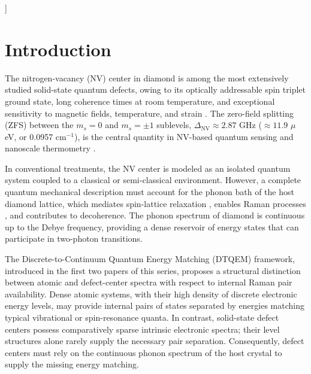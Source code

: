 \documentclass[11pt,a4paper]{article}
\begin{document}
\begin{@twocolumnfalse}
\begin{abstract}
These findings support the DTQEM screening hypothesis at the level of spectral structure: defect spectra are structurally incapable of supplying internal Raman pairs at the NV energy scale, while Fe I shows a robust and reproducible excess. The study remains agnostic about microscopic coupling mechanisms and establishes a reproducible methodology for candidate selection in quantum sensing contexts.

\vspace{0.3cm}
\noindent\textbf{Keywords:} NV center, Raman pairs, spectral statistics, DTQEM, defect centers, phonon bath, Brody distribution, false discovery rate

\vspace{0.3cm}
\noindent\textbf{Data Availability:} All code, data, and figures are archived at Zenodo: \url{https://doi.org/10.5281/zenodo.20940620}
\end{abstract}
\end{@twocolumnfalse}
]

\section{Introduction}
\label{sec:intro}

The nitrogen-vacancy (NV) center in diamond is among the most extensively studied solid-state quantum defects, owing to its optically addressable spin triplet ground state, long coherence times at room temperature, and exceptional sensitivity to magnetic fields, temperature, and strain \cite{Doherty2013,Barry2020}. The zero-field splitting (ZFS) between the $m_s = 0$ and $m_s = \pm 1$ sublevels, $\Delta_{\mathrm{NV}} \approx 2.87$ GHz ($\approx 11.9$ $\mu$eV, or 0.0957 cm$^{-1}$), is the central quantity in NV-based quantum sensing and nanoscale thermometry \cite{Schirhagl2014}.

In conventional treatments, the NV center is modeled as an isolated quantum system coupled to a classical or semi-classical environment. However, a complete quantum mechanical description must account for the phonon bath of the host diamond lattice, which mediates spin-lattice relaxation \cite{Norambuena2018}, enables Raman processes \cite{Udvarhelyi2022}, and contributes to decoherence. The phonon spectrum of diamond is continuous up to the Debye frequency, providing a dense reservoir of energy states that can participate in two-photon transitions.

The Discrete-to-Continuum Quantum Energy Matching (DTQEM) framework, introduced in the first two papers of this series, proposes a structural distinction between atomic and defect-center spectra with respect to internal Raman pair availability. Dense atomic systems, with their high density of discrete electronic energy levels, may provide internal pairs of states separated by energies matching typical vibrational or spin-resonance quanta. In contrast, solid-state defect centers possess comparatively sparse intrinsic electronic spectra; their level structures alone rarely supply the necessary pair separation. Consequently, defect centers must rely on the continuous phonon spectrum of the host crystal to supply the missing energy matching.
\end{document}
